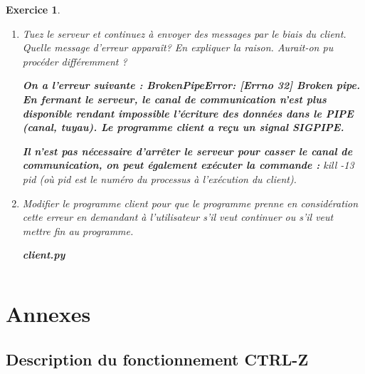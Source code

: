 \documentclass[10pt,french,A4]{article}
\theoremstyle{plain}
\newtheorem{exercice}{Exercice}
\newenvironment{code}[1]{%
    \begin{bclogo}[couleur=backcolour, couleurTexte=black ,couleurBord=blue ,couleurBarre=black, ombre=false,epBord=0.9,logo=\#,arrondi=0.1]{{\bfseries #1}}%
    }%
    {%
    \end{bclogo}
}%
\begin{document}
\begin{exercice}
\begin{enumerate}
\begin{enumerate}
              \ifProf
           \textbf{Le parent est un programme \textit{bash}, donc en utilisant les informations de  \textit{htop} on voit qu'il peut s'agir du pid 11806 ou 11792}
           \fi
           \item Comment mettre fin au  processus associé serveur.py ? (donnez deux possibilités)
            
             \ifProf
           \textbf{En tapant Ctrl-C, avec  la fenêtre du terminal correspondant actif, en cliquant sur la croix de la fenêtre appropriée ou en tapant dans une console kill -2 11812.}
           \fi
       \end{enumerate}
        \item Tuez le serveur et continuez à envoyer des messages par le biais du client. Quelle message d'erreur apparaît? En expliquer la raison.
        Aurait-on pu procéder différemment ?
        
         \ifProf
        \textbf{On a l'erreur suivante : BrokenPipeError: [Errno 32] Broken pipe.\\ En fermant le serveur, le canal de communication n'est plus disponible rendant impossible l'écriture des données dans le PIPE (canal, tuyau). Le programme client a reçu un signal SIGPIPE.}
        
         \textbf{Il n'est pas nécessaire d'arrêter le serveur pour casser le canal de communication, on peut également exécuter la commande : } 
 kill -13 pid  (où pid est le numéro du processus à l'exécution du client).

        \fi
        
        \item Modifier le programme client pour que le programme prenne en considération cette erreur en demandant à l'utilisateur s'il veut continuer ou s'il veut mettre fin au programme.
        
        \ifProf
   
        \begin{code}{client.py}
            \inputminted[fontsize=\small]{Python}{client_cor.py}
        \end{code}
        \fi
    \end{enumerate}
    
\end{exercice}
\newpage
\section{Annexes}

\subsection{Description du fonctionnement CTRL-Z}
\end{document}
